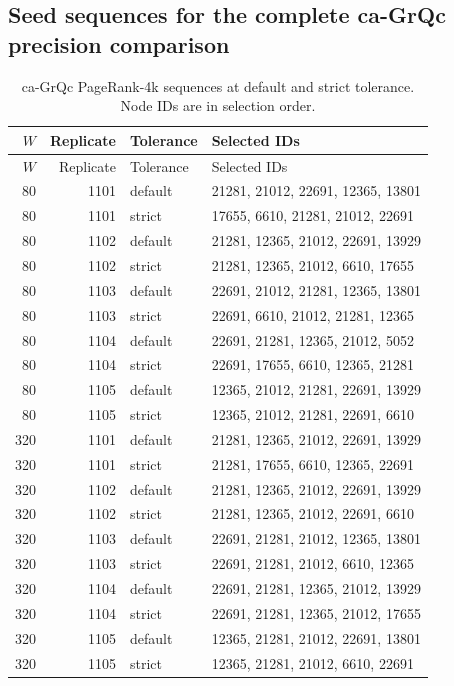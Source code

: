 \subsection{Seed sequences for the complete ca-GrQc precision comparison}
\begin{longtable}{rrll}
\caption{ca-GrQc PageRank-4k sequences at default and strict tolerance. Node IDs are in selection order.}\label{tab:precision-seeds}\\
\toprule $W$ & Replicate & Tolerance & Selected IDs \\ \midrule\endfirsthead
\toprule $W$ & Replicate & Tolerance & Selected IDs \\ \midrule\endhead
80 & 1101 & default & 21281, 21012, 22691, 12365, 13801 \\
80 & 1101 & strict & 17655, 6610, 21281, 21012, 22691 \\
80 & 1102 & default & 21281, 12365, 21012, 22691, 13929 \\
80 & 1102 & strict & 21281, 12365, 21012, 6610, 17655 \\
80 & 1103 & default & 22691, 21012, 21281, 12365, 13801 \\
80 & 1103 & strict & 22691, 6610, 21012, 21281, 12365 \\
80 & 1104 & default & 22691, 21281, 12365, 21012, 5052 \\
80 & 1104 & strict & 22691, 17655, 6610, 12365, 21281 \\
80 & 1105 & default & 12365, 21012, 21281, 22691, 13929 \\
80 & 1105 & strict & 12365, 21012, 21281, 22691, 6610 \\
320 & 1101 & default & 21281, 12365, 21012, 22691, 13929 \\
320 & 1101 & strict & 21281, 17655, 6610, 12365, 22691 \\
320 & 1102 & default & 21281, 12365, 21012, 22691, 13929 \\
320 & 1102 & strict & 21281, 12365, 21012, 22691, 6610 \\
320 & 1103 & default & 22691, 21281, 21012, 12365, 13801 \\
320 & 1103 & strict & 22691, 21281, 21012, 6610, 12365 \\
320 & 1104 & default & 22691, 21281, 12365, 21012, 13929 \\
320 & 1104 & strict & 22691, 21281, 12365, 21012, 17655 \\
320 & 1105 & default & 12365, 21281, 21012, 22691, 13801 \\
320 & 1105 & strict & 12365, 21281, 21012, 6610, 22691 \\

\end{longtable}
